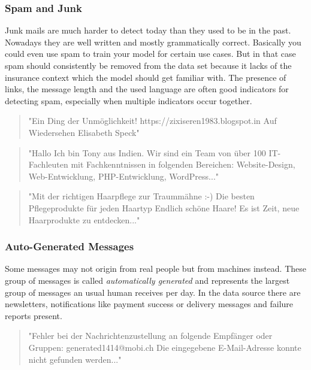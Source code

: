 \subsubsection{Spam and Junk}

Junk mails are much harder to detect today than they used to be in the past. Nowadays they are well written and mostly grammatically
correct. Basically you could even use spam to train your model for certain use cases. But in that case spam should consistently be
removed from the data set because it lacks of the insurance context which the model should get familiar with. The presence of links,
the message length and the used language are often good indicators for detecting spam, especially when multiple indicators occur together.

\begin{quote}
    "Ein Ding der Unmöglichkeit! https://zixiseren1983.blogspot.in Auf Wiedersehen Elisabeth Speck"
\end{quote}

\begin{quote}
    "Hallo Ich bin Tony aus Indien. Wir sind ein Team von über 100 IT-Fachleuten mit Fachkenntnissen in folgenden Bereichen: Website-Design, Web-Entwicklung, PHP-Entwicklung, WordPress..."
\end{quote}

\begin{quote}
    "Mit der richtigen Haarpflege zur Traummähne :-) Die besten Pflegeprodukte für jeden Haartyp Endlich schöne Haare! Es ist Zeit, neue Haarprodukte zu entdecken..."
\end{quote}

\subsubsection{Auto-Generated Messages}

Some messages may not origin from real people but from machines instead. These group of messages is called \emph{automatically generated}
and represents the largest group of messages an usual human receives per day. In the data source there are newsletters, notifications
like payment success or delivery messages and failure reports present.

\begin{quote}
    "Fehler bei der Nachrichtenzustellung an folgende Empfänger oder Gruppen: generated1414@mobi.ch Die eingegebene E-Mail-Adresse konnte nicht gefunden werden..."
\end{quote}

